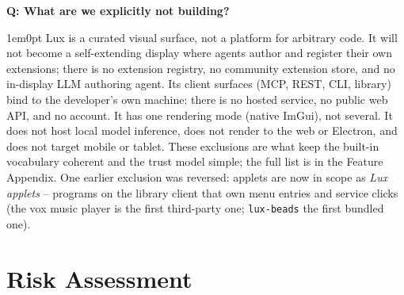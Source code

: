 \documentclass[11pt,letterpaper]{article}
\newcounter{faqnum}
\newenvironment{faqpair}[1]{%
  \needspace{4\baselineskip}%
  \vspace{0.5em}%
  \refstepcounter{faqnum}%
  \noindent\textbf{\color{SectionBlue}Q\thefaqnum: #1}\par\nopagebreak[4]%
  \vspace{0.2em}%
  \begin{adjustwidth}{1em}{0pt}%
  \setlength{\parindent}{0pt}%
}{%
  \end{adjustwidth}%
  \vspace{0.5em}%
}
\begin{document}
\begin{faqpair}{What are we explicitly not building?}\label{faq:wont}
  Lux is a curated visual surface, not a platform for arbitrary code. It will not
  become a self-extending display where agents author and register their own
  extensions; there is no extension registry, no community extension store, and
  no in-display LLM authoring agent. Its client surfaces (MCP, REST, CLI,
  library) bind to the developer's own machine: there is no hosted service, no
  public web API, and no account. It has one rendering mode (native ImGui), not
  several. It does not host local model inference, does not render to the web or
  Electron, and does not target mobile or tablet. These exclusions
  are what keep the built-in vocabulary coherent and the trust model simple; the
  full list is in the Feature Appendix. One earlier exclusion was reversed:
  applets are now in scope as \emph{Lux applets} -- programs on the library
  client that own menu entries and service clicks (the vox music player is the
  first third-party one; \texttt{lux-beads} the first bundled one).
\end{faqpair}


\newpage
\section*{Risk Assessment}
\end{document}
